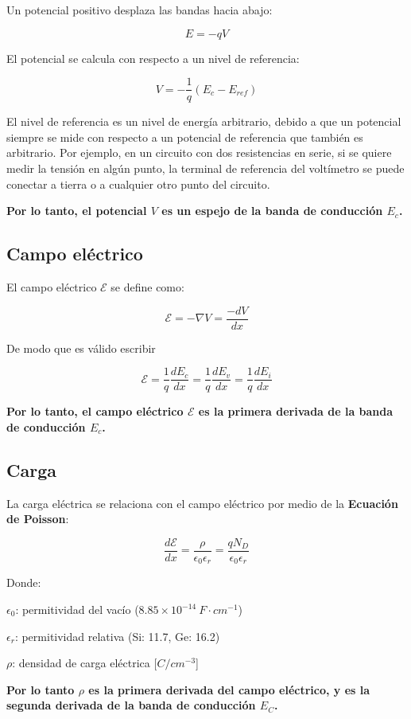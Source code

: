 Un potencial positivo desplaza las bandas hacia abajo:

\[ E = -qV \]

El potencial se calcula con respecto a un nivel de referencia:

\[ V = -\dfrac{1}{q} (E_c - E_{ref}) \]

El nivel de referencia es un nivel de energía arbitrario, debido a que un potencial siempre se mide con respecto a un potencial de referencia que también es arbitrario. Por ejemplo, en un circuito con dos resistencias en serie, si se quiere medir la tensión en algún punto, la terminal de referencia del voltímetro se puede conectar a tierra o a cualquier otro punto del circuito.

\textbf{Por lo tanto, el potencial $V$ es un espejo de la banda de conducción $E_c$.}


\subsection{Campo eléctrico}

El campo eléctrico $\mathcal{E}$ se define como:

\[ \mathcal{E} = -\nabla V = \dfrac{-dV}{dx} \]

De modo que es válido escribir

\[ \mathcal{E} =  \dfrac{1}{q} \dfrac{dE_c}{dx} = \dfrac{1}{q} \dfrac{dE_v}{dx} = \dfrac{1}{q} \dfrac{dE_i}{dx} \]

\textbf{Por lo tanto, el campo eléctrico $\mathcal{E}$ es la primera derivada de la banda de conducción $E_c$.}


\subsection{Carga}

La carga eléctrica se relaciona con el campo eléctrico por medio de la \textbf{Ecuación de Poisson}:

\[ \dfrac{d\mathcal{E}}{dx} = \dfrac{\rho}{\epsilon_0 \epsilon_r} = \dfrac{q N_D}{\epsilon_0 \epsilon_r} \]

Donde:

$\epsilon_0$: permitividad del vacío ($8.85 \times 10^{-14}\ F\cdot{}cm^{-1}$)

$\epsilon_r$: permitividad relativa (Si: 11.7, Ge: 16.2)

$\rho$: densidad de carga eléctrica [$C/cm^{-3}$]

\textbf{Por lo tanto $\rho$ es la primera derivada del campo eléctrico, y es la segunda derivada de la banda de conducción $E_C$.}

